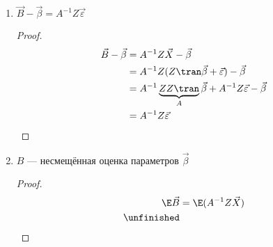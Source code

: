 \begin{prop}\itemfix
    \begin{enumerate}
        \item \(\vec{B} - \vec{\beta} = A^{-1} Z \vec{\varepsilon}\)
              \begin{proof}
                  \begin{align*}
                      \vec{B} - \vec{\beta}
                       & = A^{-1}Z \vec{X} - \vec{\beta}                                                           \\
                       & = A^{-1}Z (Z\tran \vec{\beta} + \vec{\varepsilon}) - \vec{\beta}                          \\
                       & = A^{-1} \underbrace{Z Z\tran}_{A} \vec{\beta} + A^{-1} Z \vec{\varepsilon} - \vec{\beta} \\
                       & = A^{-1} Z \vec{\varepsilon}                                                              \\
                  \end{align*}
              \end{proof}
        \item \(B\) --- несмещённая оценка параметров \(\vec{\beta}\)
              \begin{proof}
                  \begin{align*}
                      \E \vec{B}
                       & = \E(A^{-1}Z \vec{X}) \\
                      \text{\unfinished}
                  \end{align*}
              \end{proof}
    \end{enumerate}
\end{prop}
